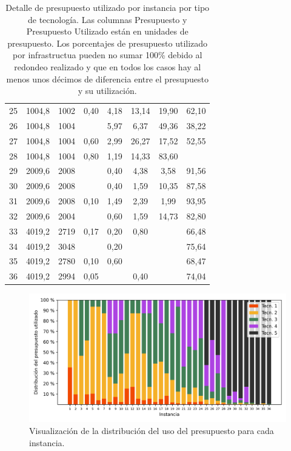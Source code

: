 \begin{table}
\begin{tabular}{cccccccc}
      25 & 1004,8 & 1002 & 0,40 & 4,18 & 13,14 & 19,90 & 62,10 \\
      26 & 1004,8 & 1004 &  & 5,97 & 6,37 & 49,36 & 38,22 \\
      27 & 1004,8 & 1004 & 0,60 & 2,99 & 26,27 & 17,52 & 52,55 \\
      28 & 1004,8 & 1004 & 0,80 & 1,19 & 14,33 & 83,60 &  \\
      29 & 2009,6 & 2008 &  & 0,40 & 4,38 & 3,58 & 91,56 \\
      30 & 2009,6 & 2008 &  & 0,40 & 1,59 & 10,35 & 87,58 \\
      31 & 2009,6 & 2008 & 0,10 & 1,49 & 2,39 & 1,99 & 93,95 \\
      32 & 2009,6 & 2004 &  & 0,60 & 1,59 & 14,73 & 82,80 \\
      33 & 4019,2 & 2719 & 0,17 & 0,20 & 0,80 &  & 66,48 \\
      34 & 4019,2 & 3048 &  & 0,20 &  &  & 75,64 \\
      35 & 4019,2 & 2780 & 0,10 & 0,60 &  &  & 68,47 \\
      36 & 4019,2 & 2994 & 0,05 &  & 0,40 &  & 74,04 \\
      \bottomrule
  \end{tabular}
  \caption{Detalle de presupuesto utilizado por instancia por tipo de tecnología. Las columnas Presupuesto y Presupuesto Utilizado están en unidades de presupuesto. Los porcentajes de presupuesto utilizado por infrastructua pueden no sumar 100\% debido al redondeo realizado y que en todos los casos hay al menos unos décimos de diferencia entre el presupuesto y su utilización.} \label{table:sensibilitybudgetusage}
\end{table}

\begin{figure}[h!]
  \centering
  \includegraphics[width=12cm]{../resources/budget_use_by_infra.png}
  \caption{Visualización de la distribución del uso del presupuesto para cada instancia.}
  \label{fig:sensibilitybudgetusage}
\end{figure}

